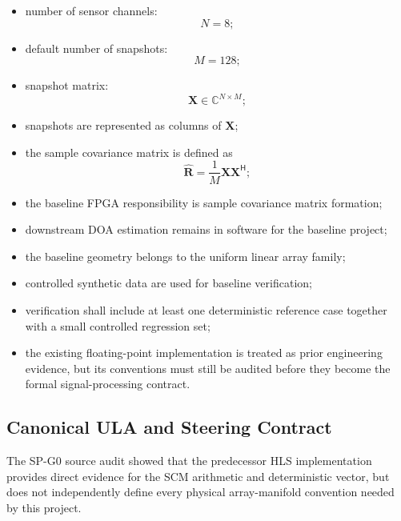 \begin{itemize}
    \item number of sensor channels:
    \[
    N = 8;
    \]

    \item default number of snapshots:
    \[
    M = 128;
    \]

    \item snapshot matrix:
    \[
    \mathbf X \in \mathbb C^{N\times M};
    \]

    \item snapshots are represented as columns of $\mathbf X$;

    \item the sample covariance matrix is defined as
    \[
    \widehat{\mathbf R}
    =
    \frac{1}{M}
    \mathbf X \mathbf X^{\mathsf H};
    \]

    \item the baseline FPGA responsibility is sample covariance matrix
    formation;

    \item downstream DOA estimation remains in software for the baseline
    project;

    \item the baseline geometry belongs to the uniform linear array family;

    \item controlled synthetic data are used for baseline verification;

    \item verification shall include at least one deterministic reference case
    together with a small controlled regression set;

    \item the existing floating-point implementation is treated as prior
    engineering evidence, but its conventions must still be audited before
    they become the formal signal-processing contract.
\end{itemize}

\subsection{Canonical ULA and Steering Contract}

The SP-G0 source audit showed that the predecessor HLS implementation
provides direct evidence for the SCM arithmetic and deterministic vector, but
does not independently define every physical array-manifold convention needed
by this project.


